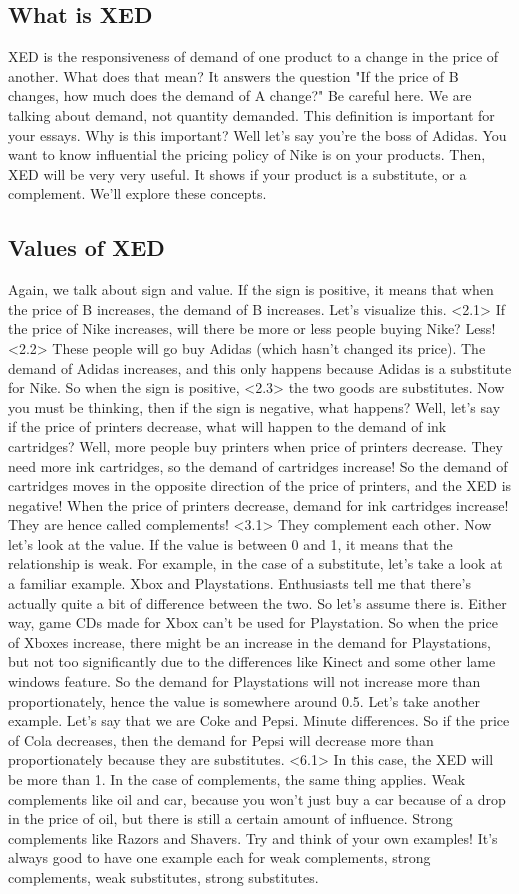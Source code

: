 \subsection{What is XED}
XED is the responsiveness of demand of one product to a change in the price of another. What does that mean? It answers the question "If the price of B changes, how much does the demand of A change?" Be careful here. We are talking about demand, not quantity demanded. This definition is important for your essays. Why is this important? Well let's say you're the boss of Adidas. You want to know influential the pricing policy of Nike is on your products. Then, XED will be very very useful. It shows if your product is a substitute, or a complement. We'll explore these concepts.
\subsection{Values of XED}
Again, we talk about sign and value. If the sign is positive, it means that when the price of B increases, the demand of B increases. Let's visualize this. <2.1> If the price of Nike increases, will there be more or less people buying Nike? Less! <2.2> These people will go buy Adidas (which hasn't changed its price). The demand of Adidas increases, and this only happens because Adidas is a substitute for Nike. So when the sign is positive, <2.3> the two goods are substitutes. Now you must be thinking, then if the sign is negative, what happens? Well, let's say if the price of printers decrease, what will happen to the demand of ink cartridges? Well, more people buy printers when price of printers decrease. They need more ink cartridges, so the demand of cartridges increase! So the demand of cartridges moves in the opposite direction of the price of printers, and the XED is negative! When the price of printers decrease, demand for ink cartridges increase! They are hence called complements! <3.1> They complement each other. 
Now let's look at the value. If the value is between 0 and 1, it means that the relationship is weak. For example, in the case of a substitute, let's take a look at a familiar example. Xbox and Playstations. Enthusiasts tell me that there's actually quite a bit of difference between the two. So let's assume there is. Either way, game CDs made for Xbox can't be used for Playstation. So when the price of Xboxes increase, there might be an increase in the demand for Playstations, but not too significantly due to the differences like Kinect and some other lame windows feature. So the demand for Playstations will not increase more than proportionately, hence the value is somewhere around 0.5. Let's take another example. Let's say that we are Coke and Pepsi. Minute differences. So if the price of Cola decreases, then the demand for Pepsi will decrease more than proportionately because they are substitutes. <6.1> In this case, the XED will be more than 1. In the case of complements, the same thing applies. Weak complements like oil and car, because you won't just buy a car because of a drop in the price of oil, but there is still a certain amount of influence. Strong complements like Razors and Shavers. Try and think of your own examples! It's always good to have one example each for weak complements, strong complements, weak substitutes, strong substitutes.
